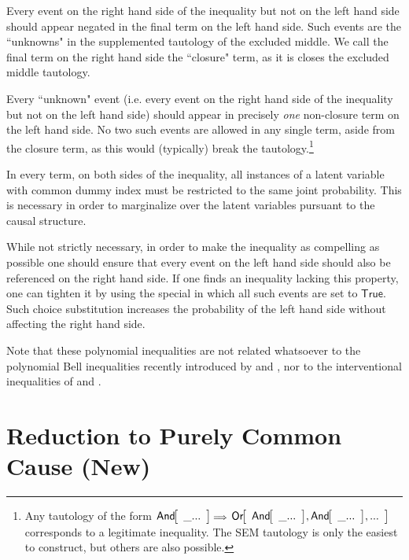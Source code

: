 \begin{compactitem}[$\bullet$]
\item Every event on the right hand side of the inequality but not on the left hand side should appear negated in the final term on the left hand side. Such events are the ``unknowns" in the supplemented tautology of the excluded middle. 
We call the final term on the right hand side the ``closure" term, as it is closes the excluded middle tautology.

\item Every ``unknown" event (i.e. every event on the right hand side of the inequality but not on the left hand side) should appear in precisely \emph{one} non-closure term on the left hand side. No two such events are allowed in any single term, aside from the closure term, as this would (typically) break the tautology.\footnote{Any tautology of the form $\NamedFunction{And}{\_...}\cramp{\scriptstyle\implies}\NamedFunction{Or}{\NamedFunction{And}{\_...},\NamedFunction{And}{\_...},...}$ corresponds to a legitimate inequality. The SEM tautology is only the easiest to construct, but others are also possible.}

\item In every term, on both sides of the inequality, all instances of a latent variable with common dummy index must be restricted to the same joint probability. This is necessary in order to marginalize over the latent variables pursuant to the causal structure.
\end{compactitem}

While not strictly necessary, in order to make the inequality as compelling as possible one should ensure that every event on the left hand side should also be referenced on the right hand side. If one finds an inequality lacking this property, one can tighten it by using the special in which all such events are set to $\mathsf{True}$. Such choice substitution increases the probability of the left hand side without affecting the right hand side.

Note that these polynomial inequalities are not related whatsoever to the polynomial Bell inequalities recently introduced by \citet{ChavesPolynomial} and \citet{RossetNetworks}, nor to the interventional inequalities of \citet{kang2007polynomialconstraints} and \citet{steeg2011relaxation}.



\section{Reduction to Purely Common Cause (New)}\label{sec:topcc}


